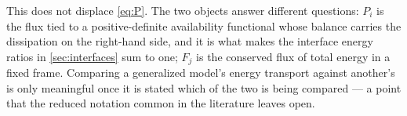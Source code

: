 This does not displace \eqref{eq:P}. The two objects answer different questions: $P_i$ is the flux tied
to a positive-definite availability functional whose balance carries the dissipation on the right-hand
side, and it is what makes the interface energy ratios in \cref{sec:interfaces} sum to one; $F_j$ is the
conserved flux of total energy in a fixed frame. Comparing a generalized model's energy transport against
another's is only meaningful once it is stated which of the two is being compared --- a point that the
reduced notation common in the literature leaves open.
